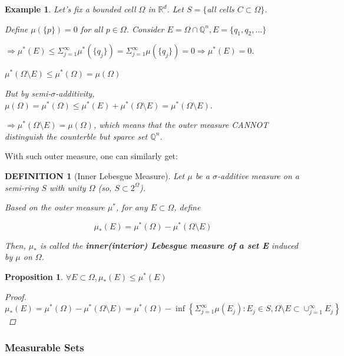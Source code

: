 \documentclass[12pt]{article}
\theoremstyle{blueplain}
\newtheorem{proposition}[theorem]{Proposition}
\theoremstyle{bluedef}
\newtheorem{definition}{DEFINITION}[section]
\theoremstyle{blueremark}
\newtheorem{example}{Example}[section]
\newcommand{\R}{\mathbb{R}}
\newcommand{\Q}{\mathbb{Q}}
\numberwithin{equation}{section}
\begin{document}
\begin{example}
  Let's fix a bounded cell $\Omega$ in $\R^d$. Let $S = \{$all cells $C \subset \Omega\}$.

  Define $\mu(\{p\}) = 0$ for all $p \in \Omega$. Consider $E = \Omega \cap \Q^n, E = \{q_1, q_2, \ldots\}$

  $\Rightarrow \mu^*(E) \leq \Sigma_{j=1}^{\infty} \mu^*(\{q_j\}) = \Sigma_{j=1}^{\infty} \mu(\{q_j\}) = 0 \Rightarrow \mu^*(E) = 0$.

  $\mu^*(\Omega \setminus E) \leq \mu^*(\Omega) = \mu(\Omega)$

  But by semi-$\sigma$-additivity,
  \(\mu(\Omega) = \mu^*(\Omega) \leq \mu^*(E) + \mu^*(\Omega \setminus E) = \mu^*(\Omega \setminus E).\)

  $\Rightarrow \mu^*(\Omega \setminus E) = \mu(\Omega)$, which means that the outer measure CANNOT distinguish the counterble but sparce set $\Q^n$.
\end{example}

With such outer measure, one can similarly get:

\begin{definition}[Inner Lebesgue Measure]

  Let $\mu$ be a $\sigma$-additive measure on a semi-ring $S$ with unity $\Omega$ (so, $S \subset 2^\Omega$).

  Based on the outer measure $\mu^*$, for any $E \subset \Omega$, define

  \[\mu_*(E) = \mu^*(\Omega) - \mu^*(\Omega \setminus E)\]

  Then, $\mu_*$ is called the \textbf{inner(interior) Lebesgue measure of a set E} induced by $\mu$ on $\Omega$.
\end{definition}


\begin{proposition}
  $\forall E \subset \Omega, \mu_*(E) \leq \mu^*(E)$
  \begin{proof}
    $\mu_*(E) = \mu^*(\Omega) - \mu^*(\Omega \setminus E) = \mu^*(\Omega) - \inf \left\{ \Sigma_{j=1}^\infty \mu(E_j) : E_j \in S, \Omega \setminus E \subset \cup_{j=1}^\infty E_j \right\}$
  \end{proof}
\end{proposition}

\subsubsection{Measurable Sets}
\end{document}
